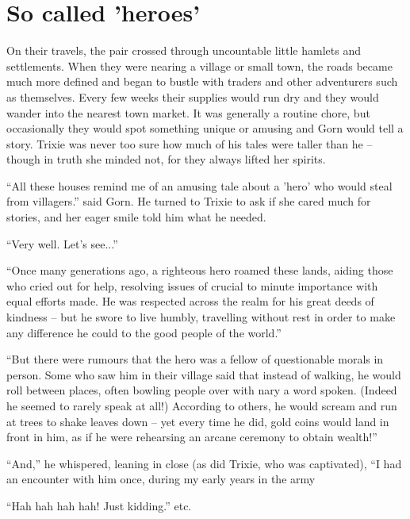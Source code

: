 
\scenesep

\section{So called 'heroes'}

On their travels, the pair crossed through uncountable little hamlets and
settlements. When they were nearing a village or small town, the roads became
much more defined and began to bustle with traders and other adventurers such as
themselves. Every few weeks their supplies would run dry and they would wander
into the nearest town market. It was generally a routine chore, but occasionally
they would spot something unique or amusing and Gorn would tell a story. Trixie
was never too sure how much of his tales were taller than he -- though in truth
she minded not, for they always lifted her spirits.

``All these houses remind me of an amusing tale about a 'hero' who would steal
from villagers.'' said Gorn. He turned to Trixie to ask if she cared much for
stories, and her eager smile told him what he needed.

``Very well. Let's see...''

``Once many generations ago, a righteous hero roamed these lands, aiding those
who cried out for help, resolving issues of crucial to minute importance with
equal efforts made. He was respected across the realm for his great deeds of
kindness -- but he swore to live humbly, travelling without rest in order to
make any difference he could to the good people of the world.''

``But there were rumours that the hero was a fellow of questionable morals in
person. Some who saw him in their village said that instead of walking, he would
roll between places, often bowling people over with nary a word spoken. (Indeed
he seemed to rarely speak at all!) According to others, he would scream and run
at trees to shake leaves down -- yet every time he did, gold coins would land in
front in him, as if he were rehearsing an arcane ceremony to obtain wealth!''

``And,'' he whispered, leaning in close (as did Trixie, who was captivated),
``I had an encounter with him once, during my early years in the army

``Hah hah hah hah! Just kidding.'' etc.

